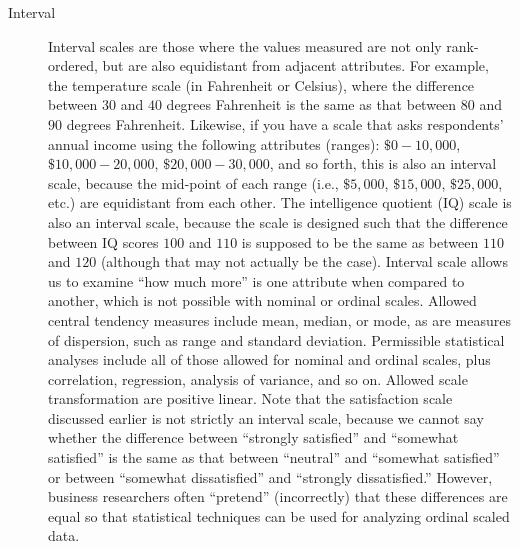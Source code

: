 \begin{description}
	\item[Interval] Interval scales are those where the values measured are not only rank-ordered, but are also equidistant from adjacent attributes. For example, the temperature scale (in Fahrenheit or Celsius), where the difference between $ 30 $ and $ 40 $ degrees Fahrenheit is the same as that between $ 80 $ and $ 90 $ degrees Fahrenheit. Likewise, if you have a scale that asks respondents' annual income using the following attributes (ranges): $ \$0 - 10,000 $, $ \$10,000 - 20,000 $, $ \$20,000 - 30,000 $, and so forth, this is also an interval scale, because the mid-point of each range (i.e., $ \$5,000 $, $ \$15,000 $, $ \$25,000 $, etc.) are equidistant from each other. The intelligence quotient (IQ) scale is also an interval scale, because the scale is designed such that the difference between IQ scores $ 100 $ and $ 110 $ is supposed to be the same as between $ 110 $ and $ 120 $ (although that may not actually be the case). Interval scale allows us to examine ``how much more'' is one attribute when compared to another, which is not possible with nominal or ordinal scales. Allowed central tendency measures include mean, median, or mode, as are measures of dispersion, such as range and standard deviation. Permissible statistical analyses include all of those allowed for nominal and ordinal scales, plus correlation, regression, analysis of variance, and so on. Allowed scale transformation are positive linear. Note that the satisfaction scale discussed earlier is not strictly an interval scale, because we cannot say whether the difference between ``strongly satisfied'' and ``somewhat satisfied'' is the same as that between ``neutral'' and ``somewhat satisfied'' or between ``somewhat dissatisfied'' and ``strongly dissatisfied.'' However, business researchers often ``pretend'' (incorrectly) that these differences are equal so that statistical techniques can be used for analyzing ordinal scaled data.
	

\end{description}
